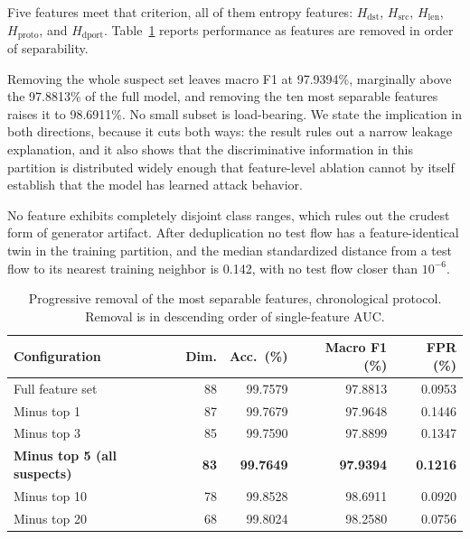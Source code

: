 \documentclass{ieeeaccess}
\begin{document}
Five features meet that criterion, all of them entropy features: $H_{\mathrm{dst}}$, $H_{\mathrm{src}}$, $H_{\mathrm{len}}$, $H_{\mathrm{proto}}$, and $H_{\mathrm{dport}}$. Table~\ref{tab:removal} reports performance as features are removed in order of separability.

Removing the whole suspect set leaves macro F1 at 97.9394\%, marginally above the 97.8813\% of the full model, and removing the ten most separable features raises it to 98.6911\%. No small subset is load-bearing. We state the implication in both directions, because it cuts both ways: the result rules out a narrow leakage explanation, and it also shows that the discriminative information in this partition is distributed widely enough that feature-level ablation cannot by itself establish that the model has learned attack behavior.

No feature exhibits completely disjoint class ranges, which rules out the crudest form of generator artifact. After deduplication no test flow has a feature-identical twin in the training partition, and the median standardized distance from a test flow to its nearest training neighbor is 0.142, with no test flow closer than $10^{-6}$.

\begin{table}[!t]
\caption{Progressive removal of the most separable features, chronological protocol. Removal is in descending order of single-feature AUC.}
\centering
\label{tab:removal}
\footnotesize
\setlength{\tabcolsep}{4pt}
\renewcommand{\arraystretch}{1.2}
\begin{tabular}{@{}lrrrr@{}}
\toprule
\textbf{Configuration} & \textbf{Dim.} & \textbf{Acc.\ (\%)} & \textbf{Macro F1 (\%)} & \textbf{FPR (\%)} \\
\midrule
Full feature set        & 88 & 99.7579 & 97.8813 & 0.0953 \\
Minus top 1             & 87 & 99.7679 & 97.9648 & 0.1446 \\
Minus top 3             & 85 & 99.7590 & 97.8899 & 0.1347 \\
\textbf{Minus top 5 (all suspects)} & \textbf{83} & \textbf{99.7649} & \textbf{97.9394} & \textbf{0.1216} \\
Minus top 10            & 78 & 99.8528 & 98.6911 & 0.0920 \\
Minus top 20            & 68 & 99.8024 & 98.2580 & 0.0756 \\
\bottomrule
\end{tabular}
\end{table}
\end{document}
